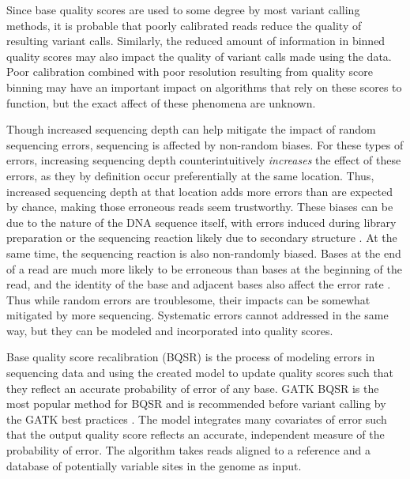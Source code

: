 Since base quality scores are used to some degree by most variant calling methods, it is probable that poorly calibrated reads reduce the quality of resulting variant calls.
Similarly, the reduced amount of information in binned quality scores may also impact the quality of variant calls made using the data.
Poor calibration combined with poor resolution resulting from quality score binning may have an important impact on algorithms that rely on these scores to function, but the exact affect of these phenomena are unknown.

Though increased sequencing depth can help mitigate the impact of random sequencing errors, sequencing is affected by non-random biases.
For these types of errors, increasing sequencing depth counterintuitively \textit{increases} the effect of these errors, as they by definition occur preferentially at the same location. Thus, increased sequencing depth at that location adds more errors than are expected by chance, making those erroneous reads seem trustworthy. 
These biases can be due to the nature of the DNA sequence itself, with errors induced during library preparation or the sequencing reaction likely due to secondary structure \parencite{meacham_identification_2011, nakamura_sequence-specific_2011, schirmer_insight_2015, ma_analysis_2019}.
At the same time, the sequencing reaction is also non-randomly biased. Bases at the end of a read are much more likely to be erroneous than bases at the beginning of the read, and the identity of the base and adjacent bases also affect the error rate \parencite{fox_accuracy_2014, schirmer_illumina_2016}. 
Thus while random errors are troublesome, their impacts can be somewhat mitigated by more sequencing. Systematic errors cannot addressed in the same way, but they can be modeled and incorporated into quality scores.

Base quality score recalibration (BQSR) is the process of modeling errors in sequencing data and using the created model to update quality scores such that they reflect an accurate probability of error of any base.
GATK BQSR  is the most popular method for BQSR and is recommended before variant calling by the GATK best practices \parencite{auwera_fastq_2013}.
The model integrates many covariates of error such that the output quality score reflects an accurate, independent measure of the probability of error.
The algorithm takes reads aligned to a reference and a database of potentially variable sites in the genome as input.

